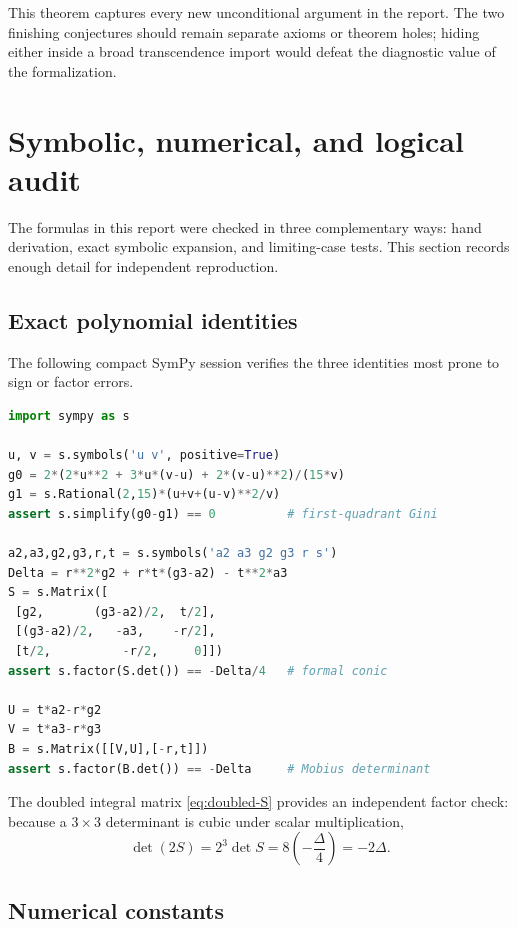\documentclass[11pt,oneside]{article}
\theoremstyle{research}
\theoremstyle{definition}
\begin{document}
This theorem captures every new unconditional argument in the report.  The two
finishing conjectures should remain separate axioms or theorem holes; hiding
either inside a broad transcendence import would defeat the diagnostic value
of the formalization.

\section{Symbolic, numerical, and logical audit}
\label{sec:audit}

The formulas in this report were checked in three complementary ways:
hand derivation, exact symbolic expansion, and limiting-case tests.  This
section records enough detail for independent reproduction.

\subsection{Exact polynomial identities}

The following compact SymPy session verifies the three identities most prone
to sign or factor errors.

\begin{lstlisting}[language=Python,caption={Exact symbolic checks used in the
report.}]
import sympy as s

u, v = s.symbols('u v', positive=True)
g0 = 2*(2*u**2 + 3*u*(v-u) + 2*(v-u)**2)/(15*v)
g1 = s.Rational(2,15)*(u+v+(u-v)**2/v)
assert s.simplify(g0-g1) == 0          # first-quadrant Gini

a2,a3,g2,g3,r,t = s.symbols('a2 a3 g2 g3 r s')
Delta = r**2*g2 + r*t*(g3-a2) - t**2*a3
S = s.Matrix([
 [g2,       (g3-a2)/2,  t/2],
 [(g3-a2)/2,   -a3,    -r/2],
 [t/2,          -r/2,     0]])
assert s.factor(S.det()) == -Delta/4   # formal conic

U = t*a2-r*g2
V = t*a3-r*g3
B = s.Matrix([[V,U],[-r,t]])
assert s.factor(B.det()) == -Delta     # Mobius determinant
\end{lstlisting}

The doubled integral matrix \eqref{eq:doubled-S} provides an independent
factor check: because a $3\times3$ determinant is cubic under scalar
multiplication,
\[
 \det(2S)=2^3\det S=8\left(-\frac\Delta4\right)=-2\Delta.
\]

\subsection{Numerical constants}
\end{document}
